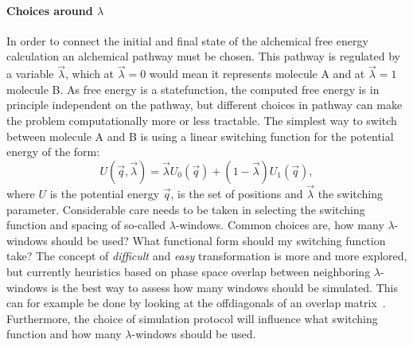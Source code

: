 \documentclass[9pt,bestpractices]{livecoms}
\begin{document}
\paragraph{Choices around $\lambda$}
In order to connect the initial and final state of the alchemical free energy calculation an alchemical pathway must be chosen. This pathway is regulated by a variable $\vec{\lambda}$, which at $\vec{\lambda}=0$ would mean it represents molecule A and at $\vec{\lambda}=1$ molecule B. As free energy is a statefunction, the computed free energy is in principle independent on the pathway, but different choices in pathway can make the problem computationally more or less tractable. The simplest way to switch between molecule A and B is using a linear switching function for the potential energy of the form:
\begin{equation}
U(\vec{q},\vec{\lambda}) = \vec{\lambda} U_0(\vec{q}) + (1-\vec{\lambda})U_1(\vec{q}),
\end{equation}
where $U$ is the potential energy $\vec{q}$, is the set of positions and $\vec{\lambda}$ the switching parameter. Considerable care needs to be taken in selecting the switching function and spacing of so-called $\lambda$-windows. Common choices are, how many $\lambda$-windows should be used? What functional form should my switching function take? The concept of \textit{difficult} and \textit{easy} transformation is more and more explored, but currently heuristics based on phase space overlap between neighboring $\lambda$-windows is the best way to assess how many windows should be simulated. This can for example be done by looking at the offdiagonals of an overlap matrix~\cite{}. Furthermore, the choice of simulation protocol will influence what switching function and how many $\lambda$-windows should be used. 
\end{document}
